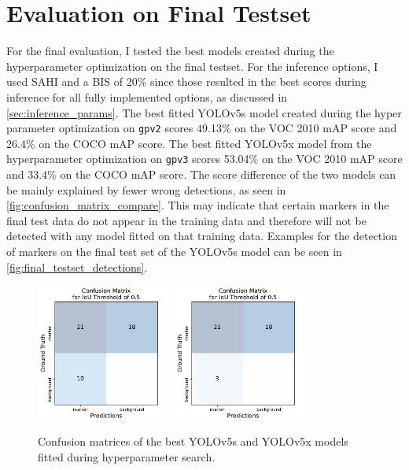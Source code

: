 \documentclass[10pt]{book}
\newcommand{\figureref}[1]{\autoref{#1}}
\begin{document}
\section{Evaluation on Final Testset}
\label{sec:final_eval}

For the final evaluation, I tested the best models created during the hyperparameter optimization on the final testset. For the inference options, I used \ac{SAHI} and a \ac{BIS} of 20\% since those resulted in the best scores during inference for all fully implemented options, as discussed in \autoref{sec:inference_params}.
The best fitted \ac{YOLO}v5s model created during the hyper parameter optimization on \texttt{gpv2} scores 49.13\% on the VOC 2010 \ac{mAP} score and 26.4\% on the COCO \ac{mAP} score. The best fitted \ac{YOLO}v5x model from the hyperparameter optimization on \texttt{gpv3} scores 53.04\% on the VOC 2010 \ac{mAP} score and 33.4\% on the COCO \ac{mAP} score. The score difference of the two models can be mainly explained by fewer wrong detections, as seen in \figureref{fig:confusion_matrix_compare}. This may indicate that certain markers in the final test data do not appear in the training data and therefore will not be detected with any model fitted on that training data. Examples for the detection of markers on the final test set of the \ac{YOLO}v5s model can be seen in \figureref{fig:final_testset_detections}.

\begin{figure} %
  \centering
     {\includegraphics[width=0.4\textwidth]{image/yolov5s_hyp_search_confusion_matrix}}
     {\includegraphics[width=0.4\textwidth]{image/yolov5x_hyp_search_confusion_matrix}}
  \caption{Confusion matrices of the best \ac{YOLO}v5s and \ac{YOLO}v5x models fitted during hyperparameter search.}
  \label{fig:confusion_matrix_compare}
\end{figure}
\end{document}
